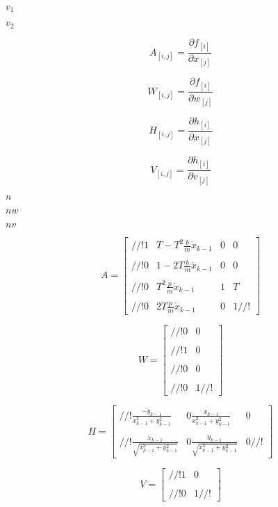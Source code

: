 \documentclass{article}
\begin{document}
$ v_{1} $
\pagebreak

$ v_{2} $
\pagebreak

\[ A_{[i,j]} = \frac{\partial f_{[i]}}{\partial x_{[j]}} \]
\pagebreak

\[ W_{[i,j]} = \frac{\partial f_{[i]}}{\partial w_{[j]}} \]
\pagebreak

\[ H_{[i,j]} = \frac{\partial h_{[i]}}{\partial x_{[j]}} \]
\pagebreak

\[ V_{[i,j]} = \frac{\partial h_{[i]}}{\partial v_{[j]}} \]
\pagebreak

$ n $
\pagebreak

$ nw $
\pagebreak

$ nv $
\pagebreak

\[ A = \left [ \begin{array}{cccc} //! 1 & T-T^{2} \frac{b}{m} \dot x_{k-1} & 0 & 0 \\ \\ //! 0 & 1-2T \frac{b}{m} \dot x_{k-1} & 0 & 0 \\ \\ //! 0 & T^{2} \frac{p}{m} \dot x_{k-1} & 1 & T \\ \\ //! 0 & 2T \frac{p}{m} \dot x_{k-1} & 0 & 1 //! \end{array} \right ] \]
\pagebreak

\[ W = \left [ \begin{array}{cc} //! 0 & 0 \\ \\ //! 1 & 0 \\ \\ //! 0 & 0\\ \\ //! 0 & 1 //! \end{array} \right ] \]
\pagebreak

\[ H = \left [ \begin{array}{cccc} //! \frac{- \dot y_{k-1}}{x_{k-1}^{2}+y_{k-1}^{2}} & 0 \frac{ \dot x_{k-1}}{x_{k-1}^{2}+y_{k-1}^{2}} & 0 \\ \\ //! \frac{ \dot x_{k-1}}{\sqrt{x_{k-1}^{2}+y_{k-1}^{2}}} & 0 \frac{ \dot y_{k-1}}{\sqrt{x_{k-1}^{2}+y_{k-1}^{2}}} & 0 //! \end{array} \right ] \]
\pagebreak

\[ V = \left [ \begin{array}{cc} //! 1 & 0 \\ \\ //! 0 & 1 //! \end{array} \right ] \]
\pagebreak
\end{document}
